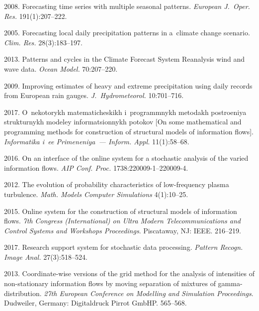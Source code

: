 \begin{multicols}{2}
{{\begin{thebibliography}{99}
 2008. Forecasting time series with multiple seasonal patterns.  
\textit{European J.~Oper. Res.} 191(1):207--222.

 2005. Forecasting local daily precipitation patterns in 
a~climate change scenario. \textit{Clim. Res.} 28(3):183--197.

2013. Patterns and cycles
in the Climate Forecast System Reanalysis wind and wave data. 
\textit{Ocean Model.} 70:207--220.

 2009. Improving
estimates of heavy and extreme precipitation using daily records from European rain
gauges. \textit{J.~Hydrometeorol.} 10:701--716.

 2017. O~nekotorykh matematicheskikh i~programmnykh metodakh
postroeniya strukturnykh modeley informatsionnykh potokov [On some mathematical and
programming methods for construction of structural models of information flows]. 
\textit{Informatika i~ee Primeneniya~---  Inform. Appl.} 11(1):58--68.

  2016. 
On an interface of the online system for a
stochastic analysis of the varied information flows. 
\textit{AIP Conf. Proc.}
1738:220009-1--\mbox{220009-4}.

 2012. The evolution of probability characteristics of
low-frequency plasma turbulence. \textit{Math. Models Computer
Simulations} 4(1):10--25.

 2015. Online system for the construction of
structural models of information flows. \textit{7th 
Congress (International) on Ultra Modern Telecommunications and Control Systems and Workshops
Proceedings}. Piscataway, NJ: IEEE. 216--219.

 2017. 
Research support system for stochastic
data processing. \textit{Pattern Recogn. Image Anal.} 27(3):518--524.



 2013.  Coordinate-wise
versions of the grid method for the analysis of intensities of non-stationary information
flows by moving separation of mixtures of gamma-distribution.  
\textit{27th European Conference on Modelling and Simulation
Proceedings}. Dudweiler, Germany: Digitaldruck Pirrot GmbHP. 565--568.


\end{thebibliography}}}
\end{multicols}
